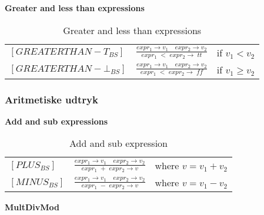 \noindent \textbf{Greater and less than expressions}

    
    
    \bgroup
    \def\arraystretch{3}
    \begin{table}[H]
    \centering
    \begin{tabular}{l c l}
        
        $[GREATERTHAN-T_{BS}]$ &$\frac{expr_1 \rightarrow v_1 \quad expr_2 \rightarrow v_2}{expr_1\;< \;expr_2 \rightarrow \; tt}$ & if $v_1 <  v_2$ \\
        
        $[GREATERTHAN-\bot_{BS}]$ &$\frac{expr_1 \rightarrow v_1 \quad expr_2 \rightarrow v_2}{expr_1\;< \;expr_2 \rightarrow \; ff}$ & if $v_1 \geq v_2$ \\
        
    \end{tabular}
    \caption{Greater and less than expressions}
    \label{tab:greaterexpr}
    \end{table}
    \egroup

\noindent \subsubsection{Aritmetiske udtryk}

\noindent \textbf{Add and sub expressions}

    \bgroup
    \def\arraystretch{3}
    \begin{table}[H]
    \centering
    \begin{tabular}{l c l}
        
        $[PLUS_{BS}]$ &$\frac{expr_1 \rightarrow v_1 \quad expr_2 \rightarrow v_2}{expr_1\;+\;expr_2 \rightarrow v}$ & where $v = v_1 + v_2$ \\
        
        $[MINUS_{BS}]$ &$\frac{expr_1 \rightarrow v_1 \quad expr_2 \rightarrow v_2}{expr_1\;-\;expr_2 \rightarrow v}$ & where $v = v_1 - v_2$ \\
        
    \end{tabular}
    \caption{Add and sub expression}
    \label{tab:addandsub}
    \end{table}
    \egroup

    
  
\noindent \textbf{MultDivMod}

    
    
